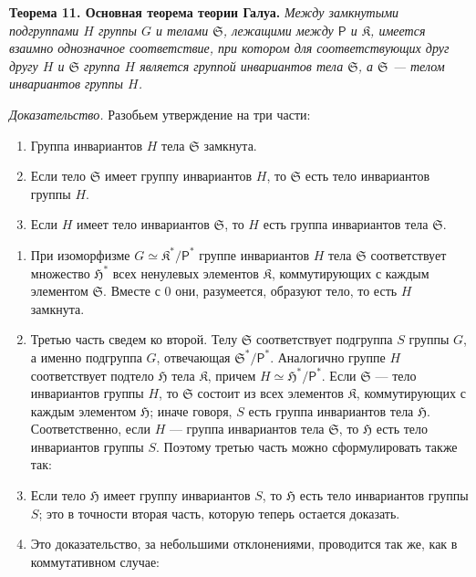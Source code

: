 \documentclass[11pt]{article}
\begin{document}
\textbf{Теорема 11. Основная теорема теории Галуа.} \emph{Между замкнутыми подгруппами \(H\) группы \(G\) и телами \(\mathfrak S\), лежащими между \(\mathsf P\) и \(\mathfrak K\), имеется взаимно однозначное соответствие, при котором для соответствующих друг другу \(H\) и \(\mathfrak S\) группа \(H\) является группой инвариантов тела \(\mathfrak S\), а \(\mathfrak S\) --- телом инвариантов группы \(H\).}

\emph{Доказательство.} Разобьем утверждение на три части:
\begin{enumerate}
\item Группа инвариантов \(H\) тела \(\mathfrak S\) замкнута.
\item Если тело \(\mathfrak S\) имеет группу инвариантов \(H\), то \(\mathfrak S\) есть тело инвариантов группы \(H\).
\item Если \(H\) имеет тело инвариантов \(\mathfrak S\), то \(H\) есть группа инвариантов тела \(\mathfrak S\).
\end{enumerate}

\begin{enumerate}
\item При изоморфизме \(G\simeq \mathfrak K^*/\mathsf P^*\) группе инвариантов \(H\) тела \(\mathfrak S\) соответствует множество \(\mathfrak H^*\) всех ненулевых элементов \(\mathfrak K\), коммутирующих с каждым элементом \(\mathfrak S\). Вместе с 0 они, разумеется, образуют тело, то есть \(H\) замкнута.

\item Третью часть сведем ко второй. Телу \(\mathfrak S\) соответствует подгруппа \(S\) группы \(G\), а именно подгруппа \(G\), отвечающая \(\mathfrak S^*/\mathsf P^*\). Аналогично группе \(H\) соответствует подтело \(\mathfrak H\) тела \(\mathfrak K\), причем \(H\simeq \mathfrak H^*/\mathsf P^*\). Если \(\mathfrak S\) --- тело инвариантов группы \(H\), то \(\mathfrak S\) состоит из всех элементов \(\mathfrak K\), коммутирующих с каждым элементом \(\mathfrak H\); иначе говоря, \(S\) есть группа инвариантов тела \(\mathfrak H\). Соответственно, если \(H\) --- группа инвариантов тела \(\mathfrak S\), то \(\mathfrak H\) есть тело инвариантов группы \(S\). Поэтому третью часть можно сформулировать также так:

\item[\(3'\).] Если тело \(\mathfrak H\) имеет группу инвариантов \(S\), то \(\mathfrak H\) есть тело инвариантов группы \(S\); это в точности вторая часть, которую теперь остается доказать.

\item[3.] Это доказательство, за небольшими отклонениями, проводится так же, как в коммутативном случае:
\end{enumerate}
\end{document}

